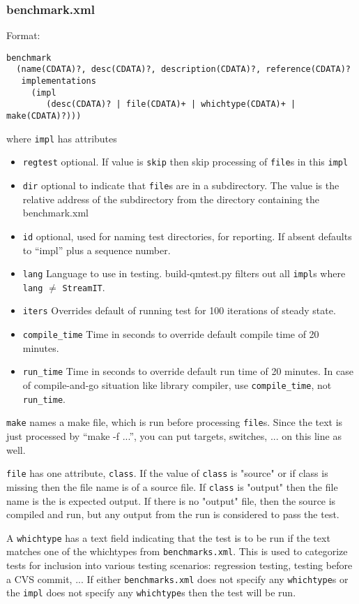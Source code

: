 \documentclass[11pt]{article}
\begin{document}
\subsubsection{benchmark.xml}
Format:\begin{verbatim}
benchmark 
  (name(CDATA)?, desc(CDATA)?, description(CDATA)?, reference(CDATA)?
   implementations 
     (impl
        (desc(CDATA)? | file(CDATA)+ | whichtype(CDATA)+ | make(CDATA)?)))
       \end{verbatim}%
where {\tt impl} has attributes
\begin{itemize}
\item {\tt regtest} optional.  If value is {\tt skip} then skip
  processing of {\tt file}s in this {\tt impl} 
\item {\tt dir} optional to indicate that {\tt file}s are in a subdirectory.
The value is the relative address of the subdirectory from the
directory containing the benchmark.xml
\item {\tt id} optional, used for naming test directories, for
  reporting.  If absent defaults to ``impl'' plus a sequence number.
\item {\tt lang} Language to use in testing.  build-qmtest.py filters
  out all {\tt impl}s where {\tt lang} $\neq$ {\tt StreamIT}.
\item {\tt iters} Overrides default of running test for 100 iterations of steady state.
\item {\tt compile\_time} Time in seconds to override default compile time of 20 minutes.
\item {\tt run\_time} Time in seconds to override default run time of 20 minutes.
In case of compile-and-go situation like library compiler, use {\tt compile\_time}, not {\tt run\_time}.
\end{itemize}

{\tt make} names a make file, which is run before processing {\tt file}s.
Since the text is just processed by ``make -f ...'', you can put targets, 
switches, ... on this line as well.

{\tt file} has one attribute, {\tt class}.  If the value of {\tt class}
is "source" or if class is missing then the file name is of a source
file.  If {\tt class} is "output" then the file name is the is expected
output.  If there is no "output" file, then the source is compiled and
run, but any output from the run is considered to pass the test.

A {\tt whichtype} has a text field indicating that the test is to be run
if the text matches one of the whichtypes from {\tt benchmarks.xml}.
This is used to categorize tests for inclusion into various testing
scenarios: regression testing, testing before a CVS commit, ... 
If either {\tt benchmarks.xml} does not specify any {\tt whichtype}s
or the {\tt impl} does not specify any {\tt whichtype}s then the test
will be run.
\end{document}
